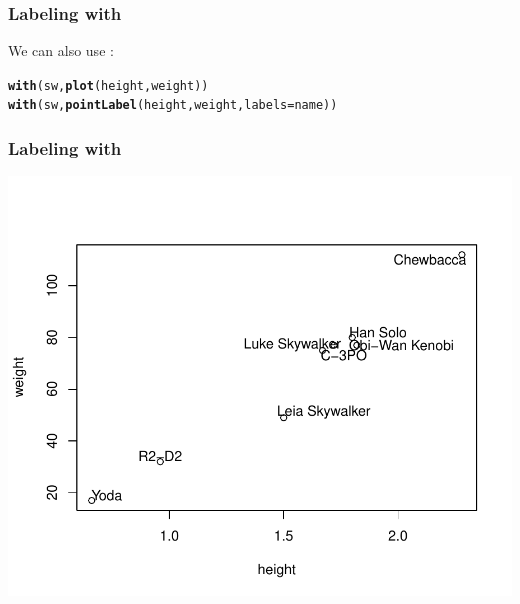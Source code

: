 \documentclass[12pt]{beamer}\usepackage[]{graphicx}\usepackage[]{color}
\makeatletter
\newcommand{\hlstd}[1]{\textcolor[rgb]{0.345,0.345,0.345}{#1}}%
\newcommand{\hlkwc}[1]{\textcolor[rgb]{0.333,0.667,0.333}{#1}}%
\newcommand{\hlkwd}[1]{\textcolor[rgb]{0.737,0.353,0.396}{\textbf{#1}}}%
\newenvironment{kframe}{%
 \def\at@end@of@kframe{}%
 \ifinner\ifhmode%
  \def\at@end@of@kframe{\end{minipage}}%
  \begin{minipage}{\columnwidth}%
 \fi\fi%
 \def\FrameCommand##1{\hskip\@totalleftmargin \hskip-\fboxsep
 \colorbox{shadecolor}{##1}\hskip-\fboxsep
     \hskip-\linewidth \hskip-\@totalleftmargin \hskip\columnwidth}%
 \MakeFramed {\advance\hsize-\width
   \@totalleftmargin\z@ \linewidth\hsize
   \@setminipage}}%
 {\par\unskip\endMakeFramed%
 \at@end@of@kframe}
\newenvironment{knitrout}{}{} %
\makeatother
\begin{document}

\begin{frame}[fragile]
\frametitle{Labeling with }

We can also use {\hilit {}}:
\begin{knitrout}\footnotesize
{}\color{fgcolor}\begin{kframe}
\begin{alltt}
\hlkwd{with}\hlstd{(sw,} \hlkwd{plot}\hlstd{(height, weight))}
\hlkwd{with}\hlstd{(sw,} \hlkwd{pointLabel}\hlstd{(height, weight,} \hlkwc{labels} \hlstd{= name))}
\end{alltt}
\end{kframe}
\end{knitrout}

\end{frame}


\begin{frame}[fragile]
\frametitle{Labeling with }

\begin{knitrout}\footnotesize
{}\color{fgcolor}

{\centering \includegraphics[width=.8\linewidth,height=.7\linewidth]{figure/sw_plot5-1} 

}



\end{knitrout}

\end{frame}
\end{document}
